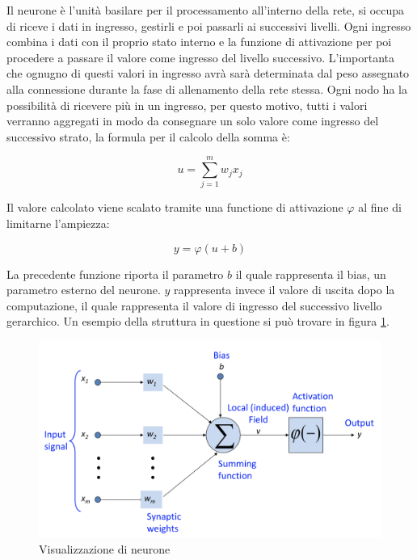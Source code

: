\documentclass[%
    corpo=12pt,
    twoside,
    oldstyle,
    autoretitolo,
    greek,
    evenboxes,
]{toptesi}
\begin{document}
Il neurone è l'unità basilare per il processamento all'interno della rete, si occupa di riceve i dati in ingresso, gestirli e poi passarli ai successivi livelli. Ogni ingresso combina i dati con il proprio stato interno e la funzione di attivazione per poi procedere a passare il valore come ingresso del livello successivo. L'importanta che ognugno di questi valori in ingresso avrà sarà determinata dal peso assegnato alla connessione durante la fase di allenamento della rete stessa. Ogni nodo ha la possibilità di ricevere più in un ingresso, per questo motivo, tutti i valori verranno aggregati in modo da consegnare un solo valore come ingresso del successivo strato, la formula per il calcolo della somma è:
\begin{center}
  \begin{equation}
    u = \sum^{m}_{j=1} w_{j}x_{j}
  \end{equation}
\end{center}
Il valore calcolato viene scalato tramite una functione di attivazione $\varphi$ al fine di limitarne l'ampiezza:
\begin{center}
  \begin{equation}
    y = \varphi(u + b)
  \end{equation}
\end{center}
La precedente funzione riporta il parametro $b$ il quale rappresenta il bias, un parametro esterno del neurone. $y$ rappresenta invece il valore di uscita dopo la computazione, il quale rappresenta il valore di ingresso del successivo livello gerarchico. Un esempio della struttura in questione si può trovare in figura \ref{fig:neuron}.
\begin{figure}[!ht]
  \includegraphics[width=\linewidth]{figure/neuron.png}
  \caption{Visualizzazione di neurone}
  \label{fig:neuron}
\end{figure}
\end{document}
